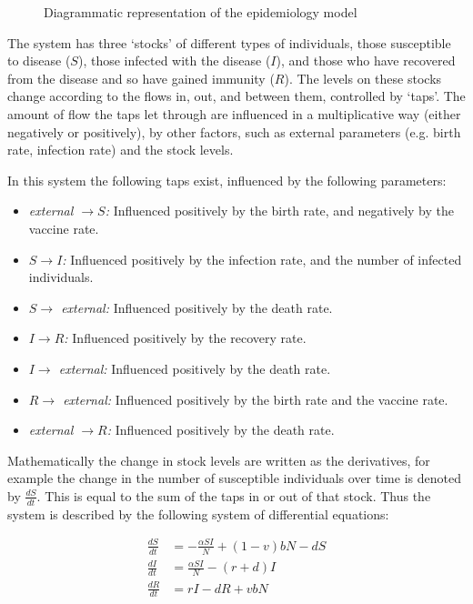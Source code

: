\begin{figure}
\begin{center}

\caption{Diagrammatic representation of the epidemiology model}
\label{fig:stockflow}
\end{center}
\end{figure}

The system has three `stocks' of different types of individuals, those
susceptible to disease ($S$), those infected with the disease ($I$), and those
who have recovered from the disease and so have gained immunity ($R$). The
levels on these stocks change according to the flows in, out, and between them,
controlled by `taps'. The amount of flow the taps let through are influenced in
a multiplicative way (either negatively or positively), by other factors, such
as external parameters (e.g. birth rate, infection rate) and the stock levels.

In this system the following taps exist, influenced by the following parameters:

\begin{itemize}
  \item \textit{external $\rightarrow S$:} Influenced positively by the birth
  rate, and negatively by the vaccine rate.
  \item \textit{$S \rightarrow I$:} Influenced positively by the infection rate,
  and the number of infected individuals.
  \item \textit{$S \rightarrow$ external:} Influenced positively by the death
  rate.
  \item \textit{$I \rightarrow R$:} Influenced positively by the recovery rate.
  \item \textit{$I \rightarrow$ external:} Influenced positively by the death
  rate.
  \item \textit{$R \rightarrow$ external:} Influenced positively by the birth
  rate and the vaccine rate.
  \item \textit{external $\rightarrow R$:} Influenced positively by the death
  rate.
\end{itemize}

Mathematically the change in stock levels are written as the derivatives, for
example the change in the number of susceptible individuals over time is denoted
by $\frac{dS}{dt}$. This is equal to the sum of the taps in or out of that
stock. Thus the system is described by the following system of differential
equations:

\begin{align}
\frac{dS}{dt} &= -\frac{\alpha SI}{N} + (1 - v)bN - dS \label{eqn:dS}\\
\frac{dI}{dt} &= \frac{\alpha SI}{N} - (r + d)I \label{eqn:dI}\\
\frac{dR}{dt} &= rI - dR + vbN \label{eqn:dR}
\end{align}

